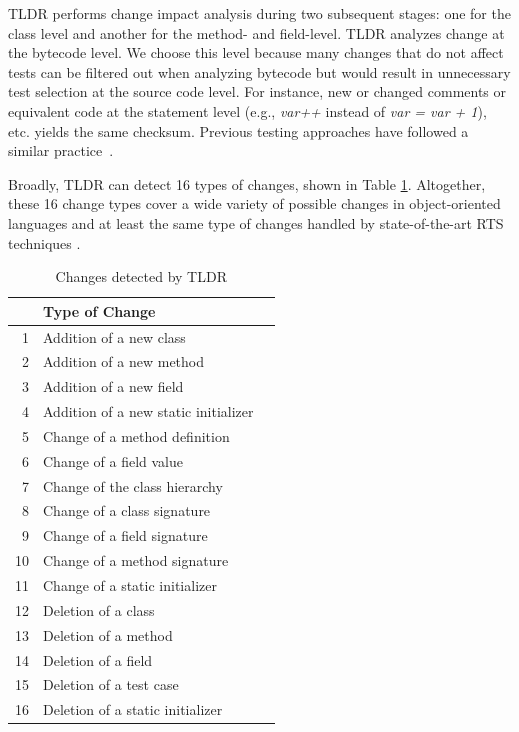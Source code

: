 TLDR performs change impact analysis during two subsequent stages: one for the class level and another for the method- and field-level. TLDR analyzes change at the bytecode level. We choose this level because many changes that do not affect tests can be filtered out when analyzing bytecode but would result in unnecessary test selection at the source code level. For instance, new or changed comments or equivalent code at the statement level (e.g., \textit{var++} instead of \textit{var = var + 1}), etc. yields the same checksum. Previous testing approaches have followed a similar practice~\cite{ekstazi, hyrts, starts, xu2007regression, fraser2011evosuite}. 

Broadly, TLDR can detect 16 types of changes, shown in Table \ref{tab:changes}. Altogether, these 16 change types cover a wide variety of possible changes in object-oriented languages and at least the same type of changes handled by state-of-the-art RTS techniques \cite{ekstazi, hyrts, starts}.

\begin{table}
  \scriptsize
  \centering
  \caption{Changes detected by TLDR}
    \begin{tabular}{r | ll}
    \multicolumn{1}{l|}{\textbf{}}  & \textbf{Type of Change} \\
    \hline
    1     & Addition of a new class \\
    2     & Addition of a new method \\
    3     & Addition of a new field \\
    4     & Addition of a new static initializer \\
    5     & Change of a method definition \\
    6     & Change of a field value\\
    7     & Change of the class hierarchy \\
    8     & Change of a class signature \\
    9     & Change of a field signature \\ 
    10    & Change of a method signature \\ 
    11    & Change of a static initializer \\ 
    12    & Deletion of a class \\ 
    13    & Deletion of a method \\ 
    14    & Deletion of a field \\ 
    15    & Deletion of a test case \\
    16    & Deletion of a static initializer \\
    \hline
    \end{tabular}%
  \label{tab:changes}%
\end{table}%

